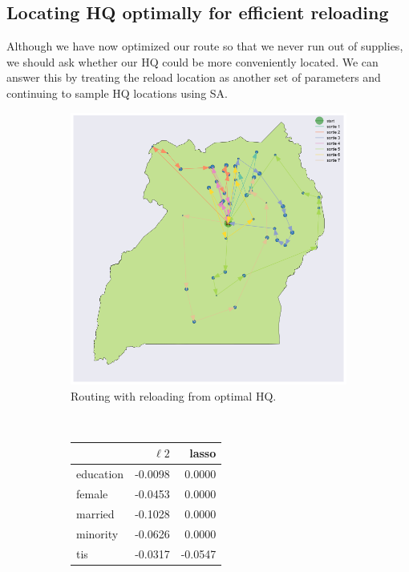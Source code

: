 \documentclass[a0,final]{a0poster}
\begin{document}
\begin{multicols}{3}
\subsection*{Locating HQ optimally for efficient reloading}

Although we have now optimized our route so that we never run out of supplies, we should ask whether our HQ could be more conveniently located. We can answer this by treating the reload location as another set of parameters and continuing to sample HQ locations using SA.

\begin{figure}[H]
  \centering
  \begin{subfigure}[b]{0.5\columnwidth}
    \centering
    \includegraphics[width=\textwidth]{../write-up/figures/routing-reloading-hq-optimal}
    \caption{Routing with reloading from optimal HQ.}
    \label{fig:b1}
  \end{subfigure}~\begin{subfigure}[b]{0.5\columnwidth}
    \centering
		\begin{tabular}{lrr}
		\toprule
		{} &        $\ell2$ &     lasso \\
		\midrule
		education & -0.0098 &  0.0000 \\
		female    & -0.0453 &  0.0000 \\
		married   & -0.1028 &  0.0000 \\
		minority  & -0.0626 &  0.0000 \\
		tis       & -0.0317 & -0.0547 \\
		\bottomrule
		\end{tabular}


\end{subfigure}
\end{figure}
\end{multicols}
\end{document}
